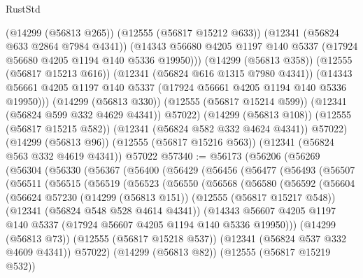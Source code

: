 \begin{lexlean}{RustStd}
\begin{coremodule}
            (@14299 (@56813 @265))
            (@12555 (@56817 @15212 @633))
            (@12341 (@56824 @633 @2864 @7984 @4341))
            (@14343 @56680 @4205 @1197 @140 @5337 (@17924 @56680 @4205 @1194 @140 @5336 @19950)))
          (@14299 (@56813 @358))
          (@12555 (@56817 @15213 @616))
          (@12341 (@56824 @616 @1315 @7980 @4341))
          (@14343 @56661 @4205 @1197 @140 @5337 (@17924 @56661 @4205 @1194 @140 @5336 @19950)))
        (@14299 (@56813 @330))
        (@12555 (@56817 @15214 @599))
        (@12341 (@56824 @599 @332 @4629 @4341))
        @57022)
      (@14299 (@56813 @108))
      (@12555 (@56817 @15215 @582))
      (@12341 (@56824 @582 @332 @4624 @4341))
      @57022)
    (@14299 (@56813 @96))
    (@12555 (@56817 @15216 @563))
    (@12341 (@56824 @563 @332 @4619 @4341))
    @57022
@57340 := @56173
    (@56206
      (@56269
        (@56304
          (@56330
            (@56367
              (@56400
                (@56429
                  (@56456
                    (@56477
                      (@56493
                        (@56507
                          (@56511
                            (@56515
                              (@56519
                                (@56523
                                  (@56550
                                    (@56568
                                      (@56580
                                        (@56592
                                          (@56604
                                            (@56624
                                              @57230
                                              (@14299 (@56813 @151))
                                              (@12555 (@56817 @15217 @548))
                                              (@12341 (@56824 @548 @528 @4614 @4341))
                                              (@14343
                                                @56607
                                                @4205
                                                @1197
                                                @140
                                                @5337
                                                (@17924 @56607 @4205 @1194 @140 @5336 @19950)))
                                            (@14299 (@56813 @73))
                                            (@12555 (@56817 @15218 @537))
                                            (@12341 (@56824 @537 @332 @4609 @4341))
                                            @57022)
                                          (@14299 (@56813 @82))
                                          (@12555 (@56817 @15219 @532))

\end{coremodule}
\end{lexlean}
